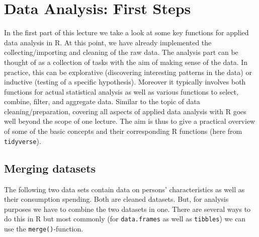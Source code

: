 \documentclass[
  12pt,
]{style/krantz}
\begin{document}
\hypertarget{data-analysis-first-steps}{%
\chapter{Data Analysis: First Steps}\label{data-analysis-first-steps}}

In the first part of this lecture we take a look at some key functions for applied data analysis in R. At this point, we have already implemented the collecting/importing and cleaning of the raw data. The analysis part can be thought of as a collection of tasks with the aim of making sense of the data. In practice, this can be explorative (discovering interesting patterns in the data) or inductive (testing of a specific hypothesis). Moreover it typically involves both functions for actual statistical analysis as well as various functions to select, combine, filter, and aggregate data. Similar to the topic of data cleaning/preparation, covering all aspects of applied data analysis with R goes well beyond the scope of one lecture. The aim is thus to give a practical overview of some of the basic concepts and their corresponding R functions (here from \texttt{tidyverse}).

\hypertarget{merging-datasets}{%
\section{Merging datasets}\label{merging-datasets}}

The following two data sets contain data on persons' characteristics as well as their consumption spending. Both are cleaned datasets. But, for analysis purposes we have to combine the two datasets in one. There are several ways to do this in R but most commonly (for \texttt{data.frames} as well as \texttt{tibbles}) we can use the \texttt{merge()}-function.
\end{document}
